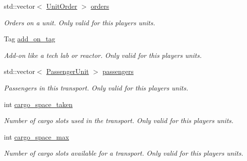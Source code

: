 \begin{DoxyCompactItemize}
std\+::vector$<$ \hyperlink{structsc2_1_1_unit_order}{Unit\+Order} $>$ \hyperlink{classsc2_1_1_unit_a45b97cf510454a385c372e512b40c51a}{orders}
\begin{DoxyCompactList}\small\item\em Orders on a unit. Only valid for this player\textquotesingle{}s units. \end{DoxyCompactList}\item 
\mbox{\label{classsc2_1_1_unit_a01b13cf74f1851983a834fdbf3e22b8a}} 
Tag \hyperlink{classsc2_1_1_unit_a01b13cf74f1851983a834fdbf3e22b8a}{add\+\_\+on\+\_\+tag}
\begin{DoxyCompactList}\small\item\em Add-\/on like a tech lab or reactor. Only valid for this player\textquotesingle{}s units. \end{DoxyCompactList}\item 
\mbox{\label{classsc2_1_1_unit_a01e2249c0d1bd27d8b61f233fbd75b66}} 
std\+::vector$<$ \hyperlink{structsc2_1_1_passenger_unit}{Passenger\+Unit} $>$ \hyperlink{classsc2_1_1_unit_a01e2249c0d1bd27d8b61f233fbd75b66}{passengers}
\begin{DoxyCompactList}\small\item\em Passengers in this transport. Only valid for this player\textquotesingle{}s units. \end{DoxyCompactList}\item 
\mbox{\label{classsc2_1_1_unit_a59fb99084581bf4871a7de173931fc79}} 
int \hyperlink{classsc2_1_1_unit_a59fb99084581bf4871a7de173931fc79}{cargo\+\_\+space\+\_\+taken}
\begin{DoxyCompactList}\small\item\em Number of cargo slots used in the transport. Only valid for this player\textquotesingle{}s units. \end{DoxyCompactList}\item 
\mbox{\label{classsc2_1_1_unit_ab5dfd5b0c6f27a8a1f89b372260d9fb2}} 
int \hyperlink{classsc2_1_1_unit_ab5dfd5b0c6f27a8a1f89b372260d9fb2}{cargo\+\_\+space\+\_\+max}
\begin{DoxyCompactList}\small\item\em Number of cargo slots available for a transport. Only valid for this player\textquotesingle{}s units. \end{DoxyCompactList}\item 

\end{DoxyCompactItemize}
